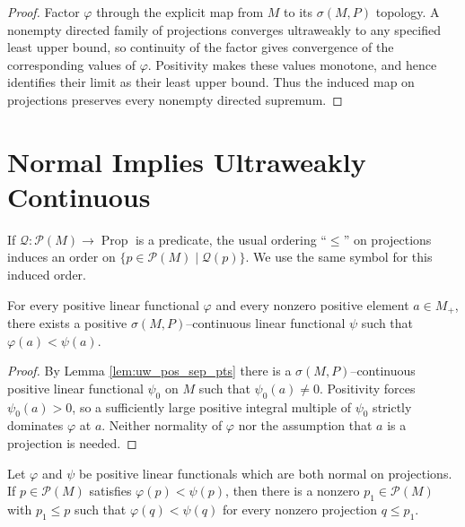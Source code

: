 \begin{proof}
  \leanok
  Factor $\varphi$ through the explicit map from $M$ to its $\sigma(M,P)$ topology. A nonempty
  directed family of projections converges ultraweakly to any specified least upper bound, so
  continuity of the factor gives convergence of the corresponding values of $\varphi$.
  Positivity makes these values monotone, and hence identifies their limit as their least upper
  bound. Thus the induced map on projections preserves every nonempty directed supremum.
\end{proof}

\section{Normal Implies Ultraweakly Continuous}

If $\mathscr{Q}:\mathcal{P}(M)\to \operatorname{Prop}$ is a predicate, the usual ordering
``$\le$'' on projections induces an order on
$\{p\in \mathcal{P}(M)\mid\mathscr{Q}(p)\}$. We use the same symbol for this induced order.

\begin{lemma}
  \label{lem:exists_uw_ge_normal}
  \leanok
  For every positive linear functional $\varphi$ and every nonzero positive element $a\in M_{+}$,
  there exists a positive $\sigma(M,P)$--continuous linear functional $\psi$ such that
  $\varphi(a)<\psi(a)$.
\end{lemma}

\begin{proof}
  \leanok
  By Lemma \ref{lem:uw_pos_sep_pts} there is a $\sigma(M,P)$--continuous positive linear
  functional $\psi_0$ on $M$ such that $\psi_0(a)\ne 0$. Positivity forces
  $\psi_0(a)>0$, so a sufficiently large positive integral multiple of $\psi_0$ strictly
  dominates $\varphi$ at $a$. Neither normality of $\varphi$ nor the assumption that $a$ is a
  projection is needed.
\end{proof}

\begin{lemma}
  \label{lem:msr_th_lemma}
  \leanok
  Let $\varphi$ and $\psi$ be positive linear functionals which are both normal on projections.
  If $p\in\mathcal{P}(M)$ satisfies $\varphi(p)<\psi(p)$, then there is a nonzero
  $p_1\in\mathcal{P}(M)$ with $p_1\le p$ such that
  $\varphi(q)<\psi(q)$ for every nonzero projection $q\le p_1$.
\end{lemma}

